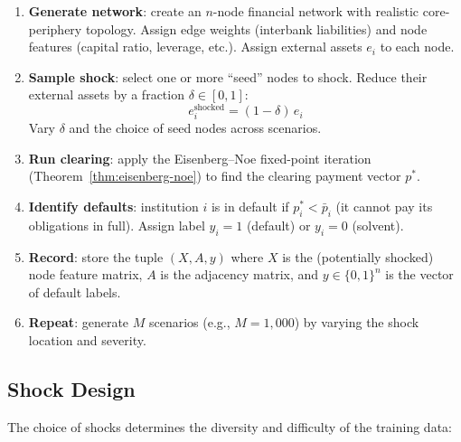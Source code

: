 \documentclass[11pt, a4paper]{article}
\theoremstyle{definition}
\theoremstyle{plain}
\theoremstyle{remark}
\begin{document}
\begin{enumerate}
    \item \textbf{Generate network}: create an $n$-node financial network with
          realistic core-periphery topology.
          Assign edge weights (interbank liabilities) and node features
          (capital ratio, leverage, etc.).
          Assign external assets $e_i$ to each node.

    \item \textbf{Sample shock}: select one or more ``seed'' nodes to shock.
          Reduce their external assets by a fraction $\delta \in [0, 1]$:
          \begin{equation}\label{eq:shock}
              e_i^{\text{shocked}} = (1 - \delta)\, e_i
          \end{equation}
          Vary $\delta$ and the choice of seed nodes across scenarios.

    \item \textbf{Run clearing}: apply the Eisenberg--Noe fixed-point iteration
          (Theorem~\ref{thm:eisenberg-noe}) to find the clearing payment vector $p^*$.

    \item \textbf{Identify defaults}: institution $i$ is in default if
          $p_i^* < \bar{p}_i$ (it cannot pay its obligations in full).
          Assign label $y_i = 1$ (default) or $y_i = 0$ (solvent).

    \item \textbf{Record}: store the tuple $(X, A, y)$ where $X$ is the
          (potentially shocked) node feature matrix, $A$ is the adjacency matrix,
          and $y \in \{0, 1\}^n$ is the vector of default labels.

    \item \textbf{Repeat}: generate $M$ scenarios (e.g., $M = 1{,}000$) by varying
          the shock location and severity.
\end{enumerate}

\subsection{Shock Design}

The choice of shocks determines the diversity and difficulty of the training data:
\end{document}
